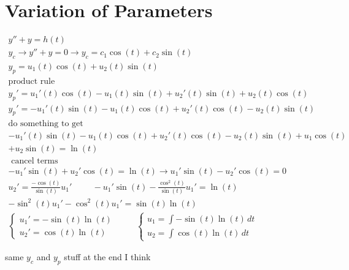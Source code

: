 \documentclass[fleqn]{report}
\newcommand{\hp}{\hspace{1cm}}
\newcommand{\equations} [1] {
\begin{gather*}
#1
\end{gather*}
}
\begin{document}
 \section{Variation of Parameters}
\equations{
y'' + y = h(t)
\\
y_c \rightarrow y'' + y = 0 \rightarrow y_c = c_1 \cos (t) + c_2 \sin (t)
\\
y_p = u_1(t) \cos (t) + u_2 (t) \sin (t)
\\
\textrm{product rule}
\\
y_p' = u_1'(t) \cos (t) - u_1(t) \sin (t) + u_2' (t) \sin (t) + u_2 (t) \cos (t)
\\
y_p' = -u_1'(t) \sin (t) - u_1(t) \cos (t) + u_2' (t) \cos (t) - u_2 (t) \sin (t)
\\
\textrm{do something to get}
\\
-u_1'(t) \sin (t) - u_1(t) \cos (t) + u_2' (t) \cos (t) - u_2 (t) \sin (t) + u_1 \cos (t) 
\\+ u_2 \sin (t) = \ln (t)
\\
\textrm{ cancel terms}
\\
-u_1' \sin(t) + u_2 ' \cos (t) = \ln (t)
\rightarrow 
u_1' \sin(t) - u_2 ' \cos (t) = 0
\\
u_2 ' = \frac{- \cos (t)}{\sin (t)} u_1'
\hp
-u_1 ' \sin (t) - \frac{\cos^2(t)}{\sin(t)} u_1' = \ln (t)
\\
- \sin^2(t) u_1' - \cos^2(t) u_1' = \sin (t) \ln (t)
\\
\begin{cases}
u_1' = - \sin (t) \ln (t)
\\
u_2' = \cos (t) \ln (t)
\end{cases}
\hp
\begin{cases}
u_1 = \int - \sin (t) \ln (t) \, dt
\\
u_2 = \int \cos (t) \ln (t) \, dt
\end{cases}
}
same $y_c$ and $y_p$ stuff at the end I think
\end{document}
